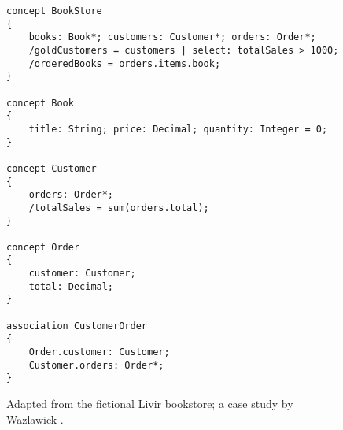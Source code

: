 \begin{figure}
\verbatimfont{\scriptsize}
\begin{verbatim}
concept BookStore
{
    books: Book*; customers: Customer*; orders: Order*;
    /goldCustomers = customers | select: totalSales > 1000;
    /orderedBooks = orders.items.book;
}

concept Book
{
    title: String; price: Decimal; quantity: Integer = 0;
}

concept Customer
{
    orders: Order*;
    /totalSales = sum(orders.total);
}

concept Order
{
    customer: Customer;
    total: Decimal;
}

association CustomerOrder
{
    Order.customer: Customer;
    Customer.orders: Order*;
}
\end{verbatim}
\caption{Adapted from the fictional Livir bookstore; a case study by Wazlawick \cite{wazlawick}.}
\label{fig:store}
\end{figure}
